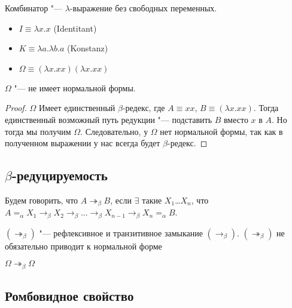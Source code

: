 \begin{definition}
	Комбинатор "--- $\lambda$-выражение без свободных переменных.
\end{definition}

\begin{definition} 
	\hfill
	\begin{itemize}
		\item $I \equiv \lambda{}x.x$ (Identitant)
		\item $K \equiv \lambda{}a.\lambda{}b.a$ (Konstanz)
		\item $\Omega \equiv (\lambda{}x.xx)(\lambda{}x.xx)$
	\end{itemize}
\end{definition}

\begin{lemma}
	$\Omega$ "--- не имеет нормальной формы.
\end{lemma}

\begin{proof}
	$\Omega$ Имеет единственный $\beta$-редекс, где $A \equiv xx$, $B \equiv (\lambda{}x.xx)$. Тогда единственный возможный путь редукции "--- подставить $B$ вместо $x$ в $A$. Но тогда мы получим $\Omega$. Следовательно, у $\Omega$ нет нормальной формы, так как в полученном выражении у нас всегда будет $\beta$-редекс.
\end{proof}

\subsection{$\beta$-редуцируемость}

\begin{definition}
	Будем говорить, что $A\twoheadrightarrow_{\beta}B$, если $\exists$ такие $X_{1}$\ldots $X_{n}$, что $A=_{\alpha}X_{1}\to_{\beta}X_{2}\to_{\beta}\ldots\to_{\beta}X_{n-1}\to_{\beta}X_{n}=_{\alpha}B$.
\end{definition}

$(\twoheadrightarrow_{\beta})$ "--- рефлексивное и транзитивное замыкание $(\to_{\beta})$. $(\twoheadrightarrow_{\beta})$ не обязательно приводит к нормальной форме
\begin{example}
	$\Omega\twoheadrightarrow_{\beta}\Omega$
\end{example}

\subsection{Ромбовидное свойство}


